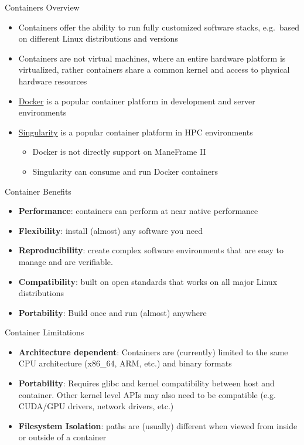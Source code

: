 \begin{frame}{Containers Overview}
	\begin{itemize}
		\item Containers offer the ability to run fully customized software stacks,
		e.g.\ based on different Linux distributions and versions
		\item Containers are not virtual machines, where an entire hardware platform is
		virtualized, rather containers share a common kernel and access to physical
		hardware resources
		\item \href{https://www.docker.com}{Docker} is a popular container platform in
		development and server environments
		\item \href{https://sylabs.io}{Singularity} is a popular container platform in
		HPC environments
		\begin{itemize}
			\item Docker is not directly support on ManeFrame II
			\item Singularity can consume and run Docker containers
		\end{itemize}
	\end{itemize}
\end{frame}

\begin{frame}{Container Benefits}
	\begin{itemize}
		\item \textbf{Performance}: containers can perform at near native performance
		\item \textbf{Flexibility}: install (almost) any software you need
		\item \textbf{Reproducibility}: create complex software environments that are easy to manage and are verifiable.
		\item \textbf{Compatibility}: built on open standards that works on all major Linux distributions
		\item \textbf{Portability}: Build once and run (almost) anywhere
	\end{itemize}
\end{frame}

\begin{frame}{Container Limitations}
	\begin{itemize}
		\item \textbf{Architecture dependent}: Containers are (currently) limited to the same CPU architecture (x86\_64, ARM, etc.) and binary formats
		\item \textbf{Portability}: Requires glibc and kernel compatibility between host and container. Other kernel level APIs may also need to be compatible (e.g. CUDA/GPU drivers, network drivers, etc.)
		\item \textbf{Filesystem Isolation}: paths are (usually) different when viewed from inside or outside of a container
	\end{itemize}
\end{frame}

